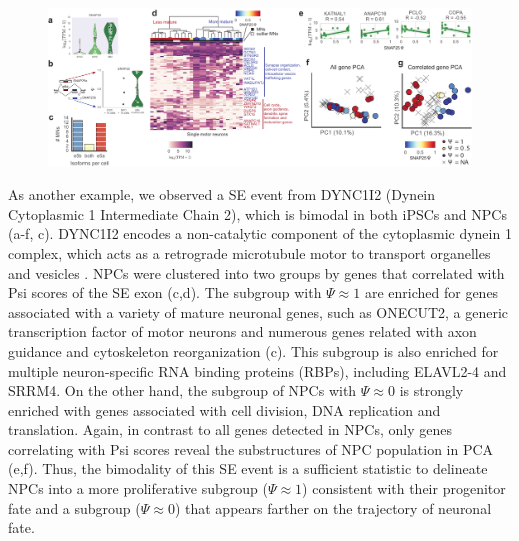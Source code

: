 \clearpage
\begin{figure}[h]
\ContinuedFloat
\captionsetup{labelformat=empty}
\centering
\includegraphics[width=5.8in]{figures/hidden_cell_states_part1.pdf}
\end{figure}
\clearpage


As another example, we observed a SE event from DYNC1I2 (Dynein Cytoplasmic 1 Intermediate Chain 2), which is bimodal in both iPSCs and NPCs (a-f, c). DYNC1I2 encodes a non-catalytic component of the cytoplasmic dynein 1 complex, which acts as a retrograde microtubule motor to transport organelles and vesicles \cite{Crackower1999-cf}. NPCs were clustered into two groups by genes that correlated with Psi scores of the SE exon (c,d). The subgroup with $\Psi \approx 1$ are enriched for genes associated with a variety of mature neuronal genes, such as ONECUT2, a generic transcription factor of motor neurons and numerous genes related with axon guidance and cytoskeleton reorganization (c). This subgroup is also enriched for multiple neuron-specific RNA binding proteins (RBPs), including ELAVL2-4 and SRRM4. On the other hand, the subgroup of NPCs with $\Psi \approx 0$ is strongly enriched with genes associated with cell division, DNA replication and translation. Again, in contrast to all genes detected in NPCs, only genes correlating with Psi scores reveal the substructures of NPC population in PCA (e,f). Thus, the bimodality of this SE event is a sufficient statistic to delineate NPCs into a more proliferative subgroup ($\Psi \approx 1$) consistent with their progenitor fate and a subgroup ($\Psi \approx 0$) that appears farther on the trajectory of neuronal fate.

